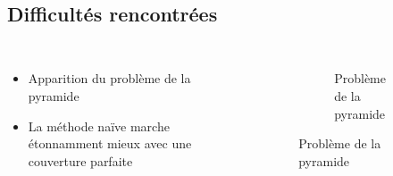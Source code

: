 \subsection{Difficultés rencontrées}

\begin{frame}[fragile=singleslide]{\insertsectionhead}

  \framesubtitle{\insertsubsectionhead}
  \begin{columns}[T,onlytextwidth]
      \vspace{.6cm}
      \begin{itemize}
        \item Apparition du problème de la pyramide
        \vspace{.3cm}
        \item La méthode naïve marche étonnamment mieux avec une couverture parfaite
      \end{itemize}
    \begin{figure}
        \begin{subfigure}{.8\textwidth}
          \caption*{Problème de la pyramide}
        \end{subfigure}
      \end{figure}
  \end{columns}
\end{frame}

